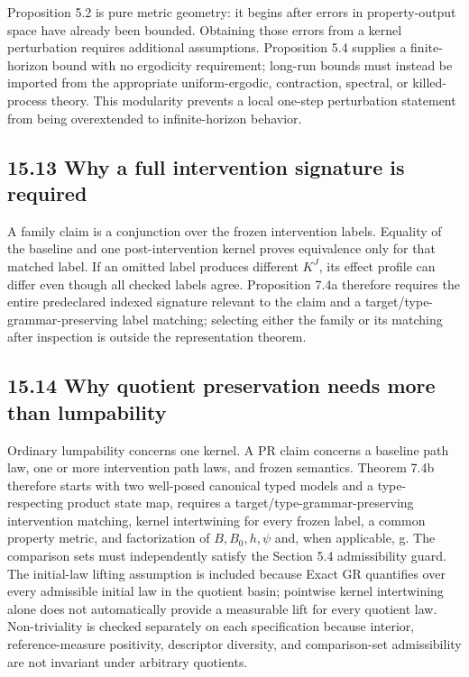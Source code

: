 \documentclass[10pt]{article}
\begin{document}
Proposition 5.2 is pure metric geometry: it begins after errors in property-output space have already been bounded. Obtaining those errors from a kernel perturbation requires additional assumptions. Proposition 5.4 supplies a finite-horizon bound with no ergodicity requirement; long-run bounds must instead be imported from the appropriate uniform-ergodic, contraction, spectral, or killed-process theory. This modularity prevents a local one-step perturbation statement from being overextended to infinite-horizon behavior.

\subsection{15.13 Why a full intervention signature is required}\label{full-signature-proof-note}

A family claim is a conjunction over the frozen intervention labels. Equality of the baseline and one post-intervention kernel proves equivalence only for that matched label. If an omitted label produces different $K^J$, its effect profile can differ even though all checked labels agree. Proposition 7.4a therefore requires the entire predeclared indexed signature relevant to the claim and a target/type-grammar-preserving label matching; selecting either the family or its matching after inspection is outside the representation theorem.

\subsection{15.14 Why quotient preservation needs more than lumpability}\label{quotient-proof-note}

Ordinary lumpability concerns one kernel. A PR claim concerns a baseline path law, one or more intervention path laws, and frozen semantics. Theorem 7.4b therefore starts with two well-posed canonical typed models and a type-respecting product state map, requires a target/type-grammar-preserving intervention matching, kernel intertwining for every frozen label, a common property metric, and factorization of $B,B_0,h,\psi$ and, when applicable, g. The comparison sets must independently satisfy the Section 5.4 admissibility guard. The initial-law lifting assumption is included because Exact GR quantifies over every admissible initial law in the quotient basin; pointwise kernel intertwining alone does not automatically provide a measurable lift for every quotient law. Non-triviality is checked separately on each specification because interior, reference-measure positivity, descriptor diversity, and comparison-set admissibility are not invariant under arbitrary quotients.
\end{document}
